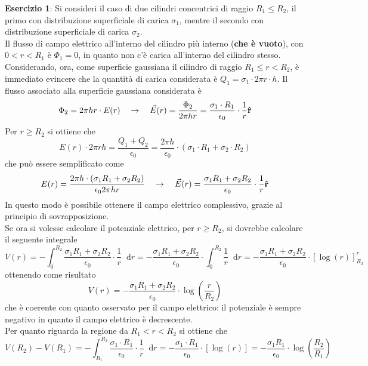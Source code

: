 \documentclass[a4paper]{extarticle}
\newcommand\dif{\mathop{}\!\mathrm{d}}
\begin{document}
\vspace{2em}
\noindent
\textbf{Esercizio 1}: Si consideri il caso di due cilindri concentrici di raggio $R_1 \leq R_2$, il primo con distribuzione superficiale di carica $\sigma_1$, mentre il secondo con distribuzione superficiale di carica $\sigma_2$.\\
Il flusso di campo elettrico all'interno del cilindro più interno (\textbf{che è vuoto}), con $0 < r < R_1$ è $\Phi_1 = 0$, in quanto non c'è carica all'interno del cilindro stesso.\\
Considerando, ora, come superficie gaussiana il cilindro di raggio $R_1 \leq r < R_2$, è immediato evincere che la quantità di carica considerata è $Q_1=\sigma_1 \cdot 2 \pi r \cdot h$. Il flusso associato alla superficie gaussiana considerata è
\[\Phi_2=2\pi h r \cdot E(r) \hspace{1em} \rightarrow \hspace{1em} \vec E(r) = \frac{\Phi_2}{2 \pi h r} = \frac{\sigma_1 \cdot R_1}{\epsilon_0} \cdot \frac{1}{r} {\bf{\hat r}}\]
Per $r \geq R_2$ si ottiene che
\[E(r) \cdot 2 \pi r h = \frac{Q_1+Q_2}{\epsilon_0} = \frac{2\pi h}{\epsilon_0} \cdot \left(\sigma_1 \cdot R_1 + \sigma_2 \cdot R_2\right)\]
che può essere semplificato come
\[E(r) = \frac{2 \pi h \cdot (\sigma_1 R_1 + \sigma_2 R_2)}{\epsilon_0 2 \pi h r} \hspace{1em} \rightarrow \hspace{1em} \vec E(r) = \frac{\sigma_1 R_1 + \sigma_2 R_2}{\epsilon_0} \cdot \frac{1}{r} {\bf{\hat r}}\]
In questo modo è possibile ottenere il campo elettrico complessivo, grazie al principio di sovrapposizione.\\
Se ora si volesse calcolare il potenziale elettrico, per $r \geq R_2$, si dovrebbe calcolare il seguente integrale
\[V(r) = -\int_{0}^{R_2} \frac{\sigma_1 R_1 + \sigma_2 R_2}{\epsilon_0} \cdot \frac{1}{r} \dif r = - \frac{\sigma_1 R_1 + \sigma_2 R_2}{\epsilon_0} \cdot \int_{0}^{R_2} \frac{1}{r} \dif r = - \frac{\sigma_1 R_1 + \sigma_2 R_2}{\epsilon_0} \cdot \left[\log(r)\right]_{R_2}^{r}\]
ottenendo come risultato
\[V(r) = - \frac{\sigma_1 R_1 + \sigma_2 R_2}{\epsilon_0} \cdot \log \left(\frac{r}{R_2}\right)\]
che è coerente con quanto osservato per il campo elettrico: il potenziale è sempre negativo in quanto il campo elettrico è decrescente.\\
Per quanto riguarda la regione da $R_1 < r < R_2$ si ottiene che
\[V(R_2) - V(R_1) = -\int_{R_1}^{R_2} \frac{\sigma_1 \cdot R_1}{\epsilon_0} \cdot \frac{1}{r} \dif r = - \frac{\sigma_1 \cdot R_1}{\epsilon_0} \cdot \left[\log(r)\right] = - \frac{\sigma_1 R_1}{\epsilon_0} \cdot \log \left(\frac{R_2}{R_1}\right)\]
\end{document}
